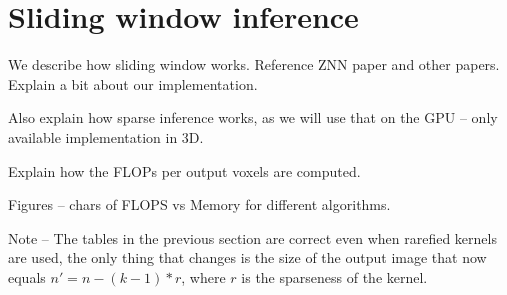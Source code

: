 \documentclass{article}
\begin{document}
\section{Sliding window inference}

We describe how sliding window works.  Reference ZNN paper and other
papers.  Explain a bit about our implementation.

Also explain how sparse inference works, as we will use that on the
GPU -- only available implementation in 3D.

Explain how the FLOPs per output voxels are computed.

Figures -- chars of FLOPS vs Memory for different algorithms.

Note -- The tables in the previous section are correct even when
rarefied kernels are used, the only thing that changes is the size of
the output image that now equals $n' = n - (k-1)*r$, where $r$ is the
sparseness of the kernel.

{\small


}
\end{document}

